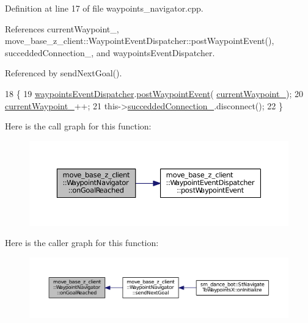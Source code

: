Definition at line 17 of file waypoints\+\_\+navigator.\+cpp.



References current\+Waypoint\+\_\+, move\+\_\+base\+\_\+z\+\_\+client\+::\+Waypoint\+Event\+Dispatcher\+::post\+Waypoint\+Event(), succedded\+Connection\+\_\+, and waypoints\+Event\+Dispatcher.



Referenced by send\+Next\+Goal().


\begin{DoxyCode}
18 \{
19   \hyperlink{classmove__base__z__client_1_1WaypointNavigator_a488a89db6cd20bc12548ac454254829f}{waypointsEventDispatcher}.\hyperlink{classmove__base__z__client_1_1WaypointEventDispatcher_a7421f1eb8aae15a3ddde7c50bea87648}{postWaypointEvent}(
      \hyperlink{classmove__base__z__client_1_1WaypointNavigator_a7da763128724f7b08c32c79cb3a88934}{currentWaypoint\_});
20   \hyperlink{classmove__base__z__client_1_1WaypointNavigator_a7da763128724f7b08c32c79cb3a88934}{currentWaypoint\_}++;
21   this->\hyperlink{classmove__base__z__client_1_1WaypointNavigator_a139d492345875777d9c9a79f9b2d494b}{succeddedConnection\_}.disconnect();
22 \}
\end{DoxyCode}


Here is the call graph for this function\+:
\nopagebreak
\begin{figure}[H]
\begin{center}
\leavevmode
\includegraphics[width=350pt]{classmove__base__z__client_1_1WaypointNavigator_ae4c5a879ff016f197c1cec54b2adaa1b_cgraph}
\end{center}
\end{figure}




Here is the caller graph for this function\+:
\nopagebreak
\begin{figure}[H]
\begin{center}
\leavevmode
\includegraphics[width=350pt]{classmove__base__z__client_1_1WaypointNavigator_ae4c5a879ff016f197c1cec54b2adaa1b_icgraph}
\end{center}
\end{figure}


